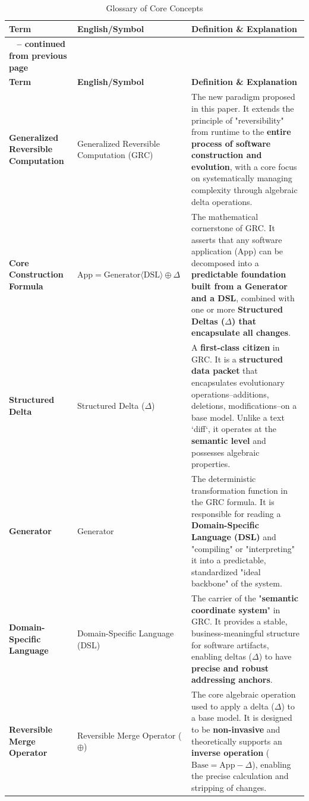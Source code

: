 \documentclass[11pt]{article}
\begin{document}
\begin{longtable}{@{} >{\bfseries}L{4.5cm} >{\raggedright}L{3.5cm} p{0.5\textwidth} @{}}
\caption{Glossary of Core Concepts} \label{tab:glossary} \\
\toprule
\textbf{Term} & \textbf{English/Symbol} & \textbf{Definition \& Explanation} \\
\midrule
\endfirsthead
{}%
{{\bfseries \tablename\ \thetable{} -- continued from previous page}} \\
\toprule
\textbf{Term} & \textbf{English/Symbol} & \textbf{Definition \& Explanation} \\
\midrule
\endhead
\bottomrule
\endfoot
Generalized Reversible Computation & Generalized Reversible Computation (GRC) & The new paradigm proposed in this paper. It extends the principle of "reversibility" from runtime to the \textbf{entire process of software construction and evolution}, with a core focus on systematically managing complexity through algebraic delta operations. \\
\addlinespace
Core Construction Formula & $\text{App} = \text{Generator}\langle\text{DSL}\rangle \oplus \Delta$ & The mathematical cornerstone of GRC. It asserts that any software application (App) can be decomposed into a \textbf{predictable foundation built from a Generator and a DSL}, combined with one or more \textbf{Structured Deltas ($\Delta$) that encapsulate all changes}. \\
\addlinespace
Structured Delta & Structured Delta ($\Delta$) & A \textbf{first-class citizen} in GRC. It is a \textbf{structured data packet} that encapsulates evolutionary operations--additions, deletions, modifications--on a base model. Unlike a text `diff`, it operates at the \textbf{semantic level} and possesses algebraic properties. \\
\addlinespace
Generator & Generator & The deterministic transformation function in the GRC formula. It is responsible for reading a \textbf{Domain-Specific Language (DSL)} and "compiling" or "interpreting" it into a predictable, standardized "ideal backbone" of the system. \\
\addlinespace
Domain-Specific Language & Domain-Specific Language (DSL) & The carrier of the "\textbf{semantic coordinate system}" in GRC. It provides a stable, business-meaningful structure for software artifacts, enabling deltas ($\Delta$) to have \textbf{precise and robust addressing anchors}. \\
\addlinespace
Reversible Merge Operator & Reversible Merge Operator ($\oplus$) & The core algebraic operation used to apply a delta ($\Delta$) to a base model. It is designed to be \textbf{non-invasive} and theoretically supports an \textbf{inverse operation} ($\text{Base} = \text{App} - \Delta$), enabling the precise calculation and stripping of changes. \\
\end{longtable}
\end{document}
